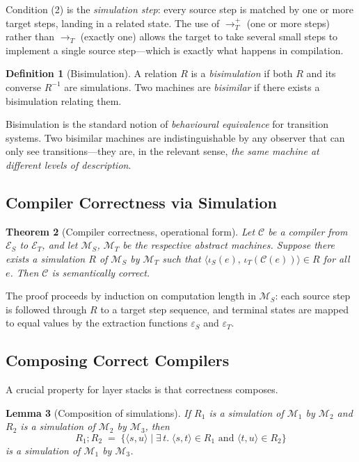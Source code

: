 \documentclass[11pt, a4paper]{article}
\theoremstyle{definition}
\newtheorem{definition}{Definition}[section]
\theoremstyle{plain}
\newtheorem{theorem}[definition]{Theorem}
\newtheorem{lemma}[definition]{Lemma}
\theoremstyle{remark}
\begin{document}
Condition (2) is the \emph{simulation step}: every source step is matched by
one or more target steps, landing in a related state. The use of $\to_T^{+}$
(one or more steps) rather than $\to_T$ (exactly one) allows the target to
take several small steps to implement a single source step---which is
exactly what happens in compilation.

\begin{definition}[Bisimulation]
  A relation $R$ is a \emph{bisimulation} if both $R$ and its converse
  $R^{-1}$ are simulations. Two machines are \emph{bisimilar} if there
  exists a bisimulation relating them.
\end{definition}

Bisimulation is the standard notion of \emph{behavioural equivalence} for
transition systems. Two bisimilar machines are indistinguishable by any
observer that can only see transitions---they are, in the relevant sense,
\emph{the same machine at different levels of description}.

\subsection{Compiler Correctness via Simulation}

\begin{theorem}[Compiler correctness, operational form]
  Let $\mathcal{C}$ be a compiler from $\mathcal{E}_S$ to $\mathcal{E}_T$,
  and let $\mathcal{M}_S$, $\mathcal{M}_T$ be the respective abstract
  machines. Suppose there exists a simulation $R$ of $\mathcal{M}_S$ by
  $\mathcal{M}_T$ such that $\langle\iota_S(e),\, \iota_T(\mathcal{C}(e))\rangle \in R$
  for all $e$. Then $\mathcal{C}$ is semantically correct.
\end{theorem}

The proof proceeds by induction on computation length in $\mathcal{M}_S$:
each source step is followed through $R$ to a target step sequence, and
terminal states are mapped to equal values by the extraction functions
$\varepsilon_S$ and $\varepsilon_T$.

\subsection{Composing Correct Compilers}

A crucial property for layer stacks is that correctness composes.

\begin{lemma}[Composition of simulations]
  If $R_1$ is a simulation of $\mathcal{M}_1$ by $\mathcal{M}_2$ and $R_2$
  is a simulation of $\mathcal{M}_2$ by $\mathcal{M}_3$, then
  \[
    R_1 \mathbin{;} R_2 \;=\; \{\langle s, u\rangle \mid \exists\, t.\; \langle s,t\rangle \in R_1
    \text{ and } \langle t, u\rangle \in R_2\}
  \]
  is a simulation of $\mathcal{M}_1$ by $\mathcal{M}_3$.
\end{lemma}
\end{document}
